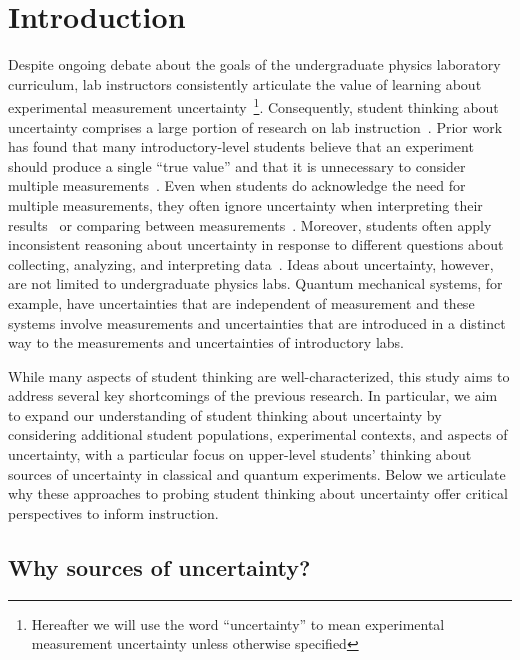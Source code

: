 \documentclass[english,aps,prstper,reprint,showpacs,longbibliography,superscriptaddress,nofootinbib]{revtex4-2}
\begin{document}
\section{Introduction}

Despite ongoing debate about the goals of the undergraduate physics laboratory curriculum, lab instructors consistently articulate the value of learning about experimental measurement uncertainty~\cite{AAPT1997,AAPT2014,Pollard2021}\footnote{Hereafter we will use the word ``uncertainty'' to mean experimental measurement uncertainty unless otherwise specified}. Consequently, student thinking about uncertainty comprises a large portion of research on lab instruction~\cite{HolmesTBD}. Prior work has found that many introductory-level students believe that an experiment should produce a single ``true value'' and that it is unnecessary to consider multiple measurements~\cite{Hull2021,Sere1993,Evangelinos1999,Leach1998,Buffler2001,Allie1998,Lubben2001}. Even when students do acknowledge the need for multiple measurements, they often ignore uncertainty when interpreting their results~\cite{Buffler2001,Leach1998,Pollard2020,Volkwyn2008,Lubben2001,Allie1998,vanKampen2021} or comparing between measurements~\cite{Buffler2001,Lubben2001,Allie1998,Kung2005,Pollard2020,Volkwyn2008,Etkina2008}.
Moreover, students often apply inconsistent reasoning about uncertainty in response to different questions about collecting, analyzing, and interpreting data~\cite{Buffler2001,Allie1998,Lubben2001}.  
Ideas about uncertainty, however, are not limited to undergraduate physics labs. Quantum mechanical systems, for example, have uncertainties that are independent of measurement and these systems involve measurements and uncertainties that are introduced in a distinct way to the measurements and uncertainties of introductory labs. 

While many aspects of student thinking are well-characterized, this study aims to address several key shortcomings of the previous research. In particular, we aim to expand our understanding of student thinking about uncertainty by considering additional student populations, experimental contexts, and aspects of uncertainty, with a particular focus on upper-level students' thinking about sources of uncertainty in classical and quantum experiments. Below we articulate why these approaches to probing student thinking about uncertainty offer critical perspectives to inform instruction.

\subsection{Why sources of uncertainty?}
\end{document}
